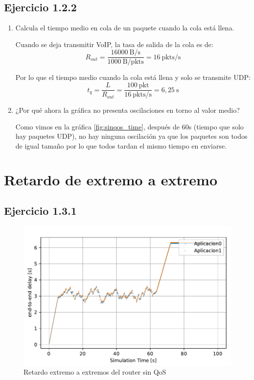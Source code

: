 \subsection{Ejercicio 1.2.2}
\begin{enumerate}
    
    \item Calcula el tiempo medio en cola de un paquete cuando la cola está llena.
    
    Cuando se deja transmitir VoIP, la tasa de salida de la cola es de:
    \[
      R_{out} = \frac{16000~\text{B/s}}{1000~\text{B/pkts}} = 16~\text{pkts/s}
    \]

    Por lo que el tiempo medio cuando la cola está llena y solo se transmite UDP:
    \[
      t_{q} = \frac{L}{R_{out}} = \frac{100~\mathrm{pkt}}{16~\mathrm{pkts/s}} = 6,25~\mathrm{s}
    \]

    \item ¿Por qué ahora la gráfica no presenta oscilaciones en torno al valor medio?
    
    Como vimos en la gráfica \ref{fig:sinqos_time}, después de 60s (tiempo que solo hay paquetes UDP), no hay ninguna oscilación
    ya que los paquetes son todos de igual tamaño por lo que todos tardan el mismo tiempo en enviarse.
  

\end{enumerate}


\section{Retardo de extremo a extremo}

\subsection{Ejercicio 1.3.1}

\begin{figure}[!ht]
    \centering
    \includegraphics{graficas/sinQoS/ end_to_end__delay_sinQoS.pdf}
    \caption{Retardo extremo a extremos del router sin QoS}
    \label{fig:sinqos_endtoend}
\end{figure}

